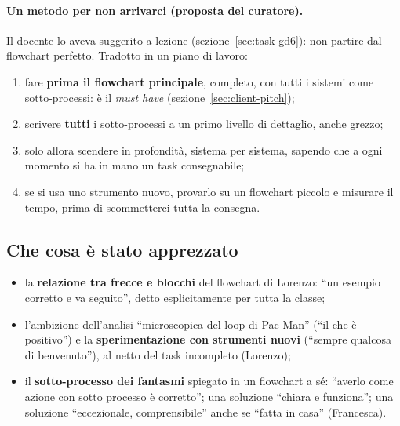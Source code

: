 \paragraph{Un metodo per non arrivarci (proposta del curatore).} Il docente
lo aveva suggerito a lezione (sezione~\ref{sec:task-gd6}): non partire dal
flowchart perfetto. Tradotto in un piano di lavoro:
\begin{enumerate}
  \item fare \textbf{prima il flowchart principale}, completo, con tutti i
        sistemi come sotto-processi: è il \emph{must have}
        (sezione~\ref{sec:client-pitch});
  \item scrivere \textbf{tutti} i sotto-processi a un primo livello di
        dettaglio, anche grezzo;
  \item solo allora scendere in profondità, sistema per sistema, sapendo che
        a ogni momento si ha in mano un task consegnabile;
  \item se si usa uno strumento nuovo, provarlo su un flowchart piccolo e
        misurare il tempo, prima di scommetterci tutta la consegna.
\end{enumerate}

\subsection{Che cosa è stato apprezzato}
\label{rv:t4:sec:apprezzato}

\begin{itemize}
  \item la \textbf{relazione tra frecce e blocchi} del flowchart di Lorenzo:
        ``un esempio corretto e va seguito'', detto esplicitamente per tutta
        la classe;
  \item l'ambizione dell'analisi ``microscopica del loop di Pac-Man'' (``il
        che è positivo'') e la \textbf{sperimentazione con strumenti nuovi}
        (``sempre qualcosa di benvenuto''), al netto del task incompleto
        (Lorenzo);
  \item il \textbf{sotto-processo dei fantasmi} spiegato in un flowchart a sé:
        ``averlo come azione con sotto processo è corretto''; una soluzione
        ``chiara e funziona''; una soluzione ``eccezionale, comprensibile''
        anche se ``fatta in casa'' (Francesca).
\end{itemize}


